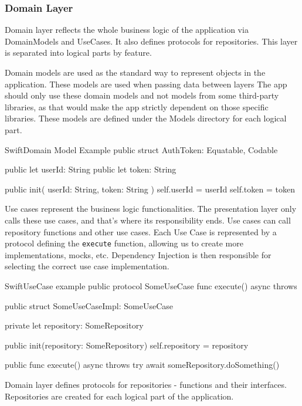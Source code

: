 \documentclass[
  biblatex = false,
  language=english,
  figures=false,
  sourcecodes,
  glossaries,
  index
]{kidiplom}
\begin{document}
\subsubsection{Domain Layer}
Domain layer reflects the whole business logic of the application via DomainModels and UseCases. It also defines protocols for repositories. This layer is separated into logical parts by feature.

Domain models are used as the standard way to represent objects in the application. These models are used when passing data between layers
The app should only use these domain models and not models from some third-party libraries, as that would make the app strictly dependent on those specific libraries.  These models are defined under the Models directory for each logical part.

\begin{kicode}{Swift}{}{Domain Model Example}
public struct AuthToken: Equatable, Codable {
    public let userId: String
    public let token: String
    
    public init(
        userId: String,
        token: String
    ) {
        self.userId = userId
        self.token = token
    }
}
\end{kicode}

Use cases represent the business logic functionalities. The presentation layer only calls these use cases, and that's where its responsibility ends. Use cases can call repository functions and other use cases. Each Use Case is represented by a protocol defining the \texttt{execute} function, allowing us to create more implementations, mocks, etc. Dependency Injection is then responsible for selecting the correct use case implementation. 

\begin{kicode}{Swift}{}{UseCase example}
public protocol SomeUseCase {
    func execute() async throws
}

public struct SomeUseCaseImpl: SomeUseCase {
    
    private let repository: SomeRepository
    
    public init(repository: SomeRepository) {
        self.repository = repository
    }
    
    public func execute() async throws {
        try await someRepository.doSomething()
    }
}
\end{kicode}

Domain layer defines protocols for repositories - functions and their interfaces. Repositories are created for each logical part of the application.
\end{document}
